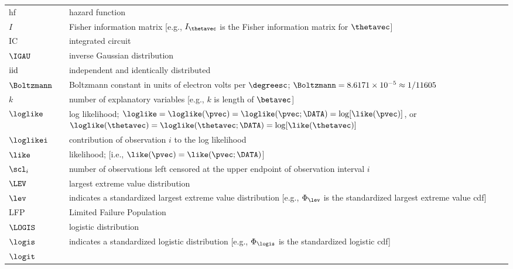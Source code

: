 \begin{supertabular}{p{0.9in}lp{4.0in}}
hf     & 
              &
hazard function
   \\
$I$ & 
& Fisher information matrix [e.g.,  $I_{\thetavec}$ 
is the Fisher information matrix for $\thetavec$]
\\
IC &
&integrated circuit
 \\
$\IGAU$ &
&inverse Gaussian distribution
 \\
${\rm iid}$ &
&independent and identically distributed
   \\
$\Boltzmann$ & 
&Boltzmann constant in units of electron volts
per $\degreesc$;
$\Boltzmann=8.6171\times 10^{-5} \approx 1/11605$
    \\
$k$           & 
              &
number of explanatory variables [e.g., $k$ is length of
$\betavec$]
    \\
$\loglike$  & 
&log likelihood; $\loglike=
\loglike(\pvec)=\loglike(\pvec;\DATA)=\log[\like(\pvec)]$,
or \newline
$\loglike(\thetavec)=\loglike(\thetavec;\DATA)=\log[\like(\thetavec)]$
   \\
$\loglikei$ &
&contribution of observation $i$ to the log likelihood 
   \\
$\like$     & 
&likelihood; [i.e., $\like(\pvec)=\like(\pvec;\DATA)$]
   \\
$\scl_{i}$ &
& number of observations left censored at the 
upper endpoint of observation interval $i$
  \\
$\LEV$ &
&largest extreme value distribution
  \\
$\lev$ &
&indicates a standardized largest extreme 
value distribution 
[e.g.,  $\Phi_{\lev}$ is the standardized largest
extreme value  cdf]
  \\
LFP &
&Limited Failure Population
   \\
$\LOGIS$    & 
&logistic distribution
   \\
$\logis$    & 
&indicates a standardized logistic distribution 
[e.g.,  $\Phi_{\logis}$ is the standardized logistic cdf]
   \\
$\logit$    & 

\end{supertabular}
